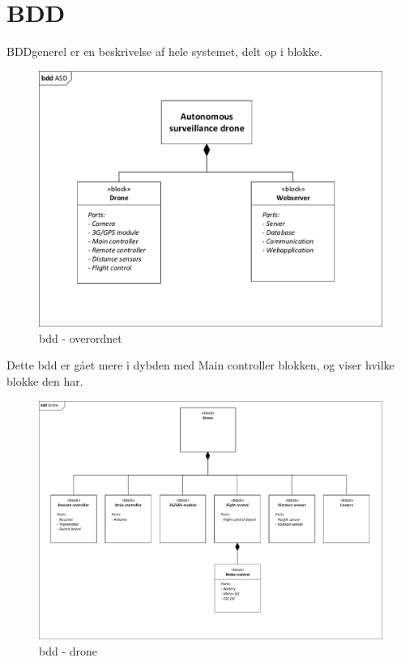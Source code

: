 \section{BDD}

BDD\textunderscore generel er en beskrivelse af hele systemet, delt op i blokke.


\begin{figure}[H]
\centering
\includegraphics[width=1\textwidth]{Billeder/BDD/bdd_overordnet.pdf}
\caption{bdd - overordnet}
\label{fig:bdd_overordnet}
\end{figure}

Dette bdd er gået mere i dybden med Main controller blokken, og viser hvilke blokke den har.

\begin{figure}[H]
\centering
\includegraphics[width=1\textwidth]{Billeder/BDD/bdd_drone.pdf}
\caption{bdd - drone}
\label{fig:bdd_drone}
\end{figure}

